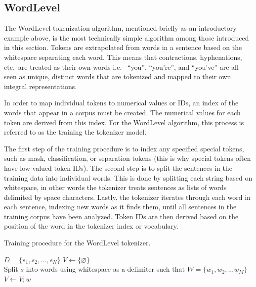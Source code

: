 \documentclass[12pt]{article}
\begin{document}
\subsection{WordLevel}\label{sec:wordlevel}
The WordLevel tokenization algorithm, mentioned briefly as an introductory example above, is the most technically simple algorithm among those
introduced in this section. Tokens are extrapolated from words in a sentence based on the whitespace separating each word. This means that
contractions, hyphenations, etc.~are treated as their own words i.e.~ ``you'', ``you're'', and ``you've'' are all seen as unique, distinct words that
are tokenized and mapped to their own integral representations.

In order to map individual tokens to numerical values or IDs, an index of the words that appear in a corpus must be created. The numerical values for
each token are derived from this index. For the WordLevel algorithm, this process is referred to as the training the tokenizer model.

The first step of the training procedure is to index any specified special tokens, such as mask, classification, or separation tokens (this is why
special tokens often have low-valued token IDs). The second step is to split the sentences in the training data into individual words. This is done
by splitting each string based on whitespace, in other words the tokenizer treats sentences as lists of words delimited by space characters. Lastly,
the tokenizer iterates through each word in each sentence, indexing new words as it finds them, until all sentences in the training corpus have been
analyzed. Token IDs are then derived based on the position of the word in the tokenizer index or vocabulary.

\begin{algorithm}
    \caption{Training procedure for the WordLevel tokenizer.}
    \label{alg:wordlevel_training}
    \begin{algorithmic}
        \State $D = \{s_1, s_2, ..., s_N\}$
        \State $V \gets \{\varnothing\}$
        \\

        \State Split $s$ into words using whitespace as a delimiter such that
        \State $W=\{w_1, w_2, ... w_M\}$
        \\

        \State $V \gets V;w$
        \EndIf
        \EndFor
        \EndFor
    \end{algorithmic}
\end{algorithm}
\end{document}

